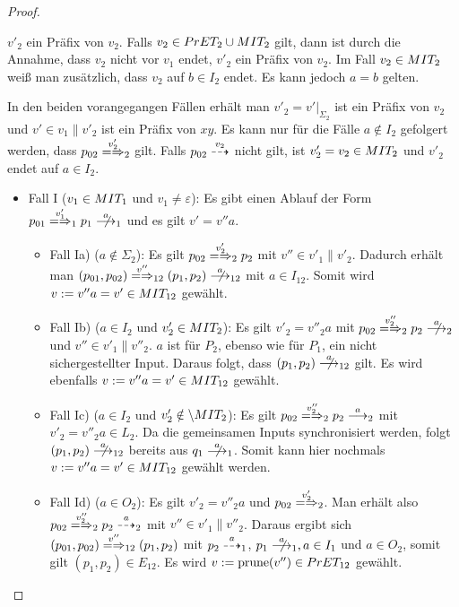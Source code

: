 \begin{proof}
\begin{itemize}
      $v'_2$ ein Präfix von $v_2$. Falls $v_2\in PrET _2\cup MIT _2$ gilt,
      dann ist durch die Annahme, dass $v_2$ nicht vor $v_1$ endet, $v'_2$ ein
      Präfix von $v_2$. Im Fall $v_2 \in MIT _2$ weiß man zusätzlich, dass
      $v_2$ auf $b\in I_2$ endet. Es kann jedoch $a=b$ gelten.
  \end{itemize}
  In den beiden vorangegangen Fällen erhält man $v'_2=v'|_{\Sigma _2}$ ist ein
  Präfix von $v_2$ und $v'\in v_1\|v'_2$ ist ein Präfix von $xy$. Es kann nur
  für die Fälle $a\notin I_2$ gefolgert werden, dass $p_{02} \weakmay[v'_2]_2$
  gilt. Falls $p_{02} \may[v_2]$ nicht gilt, ist $v'_2=v_2\in MIT _2$ und
  $v'_2$ endet auf $a\in I_2$.
  \begin{itemize}
    \item Fall I ($v_1\in MIT _1$ und $v_1\neq \varepsilon$): Es gibt einen
      Ablauf der Form $p_{01}\weakmay[v'_1]_1p_1\nmust[a]_1$ und es gilt
      $v'=v''a$.
      \begin{itemize}
        \item Fall Ia) ($a\notin\Sigma _2$): Es gilt $p_{02}\weakmay[v'_2]_2
          p_2$ mit $v''\in v'_1\|v'_2$. Dadurch erhält man $(p_{01},p_{02})
          \weakmay[v'']_{12} (p_1,p_2) \nmust[a]_{12}$ mit $a\in I_{12}$. Somit
          wird $v := v''a=v'\in MIT _{12}$ gewählt.
        \item Fall Ib) ($a\in I_2$ und $v'_2\in MIT _2$): Es gilt $v'_2=v''_2a$
          mit $p_{02}\weakmay[v''_2]_2 p_2 \nmust[a]_2$ und $v''\in
          v'_1\|v''_2$. $a$ ist für $P_2$, ebenso wie für $P_1$, ein nicht
          sichergestellter Input. Daraus folgt, dass $(p_1,p_2)\nmust[a]_{12}$
          gilt. Es wird ebenfalls $v := v''a=v'\in MIT _{12}$ gewählt.
        \item Fall Ic) ($a\in I_2$ und $v'_2\notin \backslash MIT _2$): Es gilt
          $p_{02}\weakmay[v''_2]_2p_2\must[a]_2$ mit $v'_2=v''_2a \in L_2$. Da
          die gemeinsamen Inputs synchronisiert werden, folgt $(p_1,p_2)
          \nmust[a]_{12}$ bereits aus $q_1\nmust[a]_1$. Somit kann hier
          nochmals $v:=v''a=v'\in MIT _{12}$ gewählt werden.
        \item Fall Id) ($a\in O_2$): Es gilt $v'_2=v''_2a$ und $p_{02}
          \weakmay[v'_2]_2$. Man erhält also $p_{02}\weakmay[v''_2]_2 p_2 \may[a]_2$
          mit $v''\in v'_1\|v''_2$. Daraus ergibt sich $(p_{01},p_{02})
          \weakmay[v'']_{12} (p_1,p_2)$ mit $p_2\may[a]_1$, $p_1\nmust[a]_1,
          a\in I_1$ und $a\in O_2$, somit gilt $(p_1,p_2)\in E_{12}$.
          Es wird $v:= \mathrm{prune} (v'')\in PrET _{12}$ gewählt.

\end{itemize}
\end{itemize}
\end{proof}
